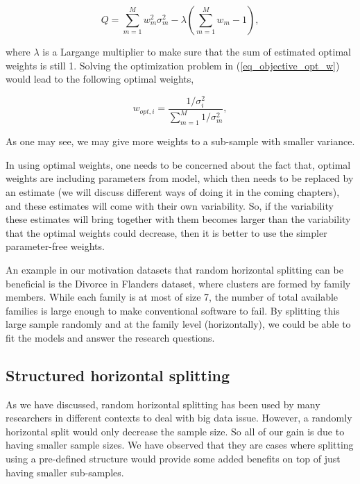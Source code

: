 \documentclass[11pt,a5paper,twoside]{book}
\begin{document}
\begin{equation}
\label{eq_objective_opt_w}
Q = \sum_{m=1}^M w_m^2 \sigma_m^2 - \lambda \left(\sum_{m=1}^M w_m -1 \right),
\end{equation}

where $\lambda$ is a Largange multiplier to make sure that the sum of estimated optimal weights is still 1. Solving the optimization problem in (\ref{eq_objective_opt_w}) would lead to the following optimal weights,

\begin{equation}
\label{eq_opt_w}
w_{opt, i} = \frac{1/\sigma^2_i}{\sum_{m=1}^M 1/\sigma^2_m},
\end{equation}

As one may see, we may give more weights to a sub-sample with smaller variance.


In using optimal weights, one needs to be concerned about the fact that, optimal weights are including parameters from model, which then needs to be replaced by an estimate (we will discuss different ways of doing it in the coming chapters), and these estimates will come with their own variability. So, if the variability these estimates will bring together with them becomes larger than the variability that the optimal weights could decrease, then it is better to use the simpler parameter-free weights.

An example in our motivation datasets that random horizontal splitting can be beneficial is the Divorce in Flanders dataset, where clusters are formed by family members. While each family is at most of size 7, the number of total available families is large enough to make conventional software to fail. By splitting this large sample randomly and at the family level (horizontally), we could be able to fit the models and answer the research questions.

\subsection{Structured horizontal splitting}

As we have discussed, random horizontal splitting has been used by many researchers in different contexts to deal with big data issue. However, a randomly horizontal split would only decrease the sample size. So all of our gain is due to having smaller sample sizes. We have observed that they are cases where splitting using a pre-defined structure would provide some added benefits on top of just having smaller sub-samples.
\end{document}
